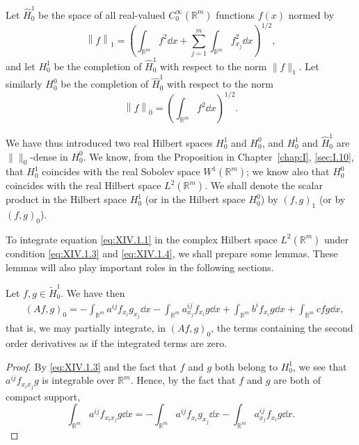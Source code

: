 Let $\hat{H}_0^1$ be the space of all real-valued $C_0^\infty (\mathbb{R}^{m})$ functions $f(x)$ normed by 
\begin{equation}\label{eq:XIV.1.5}
\left\| f \right\| _{1} = \left(\int_ {\mathbb{R}^{m}} f ^{2} \dd x + \sum\limits_{j=1} ^{m} \int_ {\mathbb{R}^{m}} f _ {x _{j}} ^{2} \dd x\right) ^{1/2},
\end{equation}
and let $H_0^1$ be the completion of $\hat{H}_0^1$ with respect to the norm $\|f\|_1$. Let similarly $H_0^0$ be the completion of $\hat{H}_0^1$ with respect to the norm 
\begin{equation}\label{eq:XIV.1.6}
\left\| f \right\| _{0} = \left(\int_ {\mathbb{R}^{m}} f ^{2} \dd x\right) ^{1/2}.
\end{equation}


We have thus introduced two real Hilbert spaces $H_0^1$ and $H_0^0$, and $H_0^1$ and $\hat{H}_0^1$ are $\|\|_0$-dense in $H_0^0$. We know, from the Proposition in Chapter~\ref{chap:I}, \ref{sec:I.10}, that $H_0^1$ coincides with the real Sobolev space $W^1(\mathbb{R}^{m})$; we know also that $H_0^0$ coincides with the real Hilbert space $L^2(\mathbb{R}^{m})$. We shall denote the scalar product in the Hilbert space $H_0^1$ (or in the Hilbert space $H_0^0$) by $(f,g)_1$ (or by $(f,g)_0$). 

To integrate equation \eqref{eq:XIV.1.1} in the complex Hilbert space $L^{2}(\mathbb{R}^{m})$ under condition \eqref{eq:XIV.1.3} and \eqref{eq:XIV.1.4}, we shall prepare some lemmas. These lemmas will also play important roles in the following sections. 

\begin{lemma}\label{lem:XIV.1.Lemma.1} Let $f, g \in \tilde{H}_0^1$. We have then 
\begin{equation}\label{eq:XIV.1.7}
\begin{aligned}
&(A f, g) _{0} =  - \int_ {\mathbb{R}^{m}} a ^{ij} f _ {x _{i}} g _ {x _{j}} \dd x - \int_ {\mathbb{R}^{m}} a _ {x _{j}} ^{ij} f _ {x _{i}} g \dd x + \int_ {\mathbb{R}^{m}} b ^{i} f _ {x _{i}} g \dd x + \int_ {\mathbb{R}^{m}} c f g \dd x,
\end{aligned}
\end{equation}
that is, we may partially integrate, in $(Af, g)_{0}$, the terms containing the second order derivatives as if the integrated terms are zero. 
\end{lemma}

\begin{proof}
 By \eqref{eq:XIV.1.3} and the fact that $f$ and $g$ both belong to $H_0^1$, we see that $a^{ij}f_{x_ix_j}g$ is integrable over $\mathbb{R}^{m}$. Hence, by the fact that $f$ and $g$ are both of compact support, 
\[
\int_ {\mathbb{R}^{m}} a ^{ij} f _ {x _{i} x _{j}} g \dd x = - \int_ {\mathbb{R}^{m}} a ^{ij} f _ {x _{i}} g _ {x _{j}} \dd x - \int_ {\mathbb{R}^{m}} a _ {x _{j}} ^{ij} f _ {x _{i}} g \dd x. \]
\end{proof}

